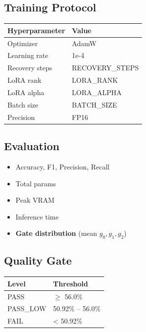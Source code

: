 \subsection{Training Protocol}

\begin{table}[H]
\centering
\small
\begin{tabular}{ll}
\toprule
\textbf{Hyperparameter} & \textbf{Value} \\
\midrule
Optimizer & AdamW \\
Learning rate & 1e-4 \\
Recovery steps & {{RECOVERY\_STEPS}} \\
LoRA rank & {{LORA\_RANK}} \\
LoRA alpha & {{LORA\_ALPHA}} \\
Batch size & {{BATCH\_SIZE}} \\
Precision & FP16 \\
\bottomrule
\end{tabular}
\end{table}

\subsection{Evaluation}

\begin{itemize}
\item Accuracy, F1, Precision, Recall
\item Total params
\item Peak VRAM
\item Inference time
\item \textbf{Gate distribution} (mean $g_0, g_1, g_2$)

\end{itemize}
\subsection{Quality Gate}

\begin{table}[H]
\centering
\small
\begin{tabular}{ll}
\toprule
\textbf{Level} & \textbf{Threshold} \\
\midrule
PASS & $\ge$ 56.0\% \\
PASS\_LOW & 50.92\% -- 56.0\% \\
FAIL & < 50.92\% \\
\bottomrule
\end{tabular}
\end{table}

